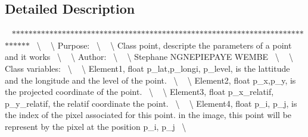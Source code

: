 \subsection{Detailed Description}
~\newline
$\ast$$\ast$$\ast$$\ast$$\ast$$\ast$$\ast$$\ast$$\ast$$\ast$$\ast$$\ast$$\ast$$\ast$$\ast$$\ast$$\ast$$\ast$$\ast$$\ast$$\ast$$\ast$$\ast$$\ast$$\ast$$\ast$$\ast$$\ast$$\ast$$\ast$$\ast$$\ast$$\ast$$\ast$$\ast$$\ast$$\ast$$\ast$$\ast$$\ast$$\ast$$\ast$$\ast$$\ast$$\ast$$\ast$$\ast$$\ast$$\ast$$\ast$$\ast$$\ast$$\ast$$\ast$$\ast$$\ast$$\ast$$\ast$$\ast$$\ast$$\ast$$\ast$$\ast$$\ast$$\ast$$\ast$$\ast$$\ast$$\ast$$\ast$$\ast$$\ast$$\ast$$\ast$$\ast$$\ast$~\newline
\textbackslash{} ~\newline
\textbackslash{} Purpose\+:~\newline
\textbackslash{} ~\newline
\textbackslash{} Class point, descripte the parameters of a point and it works~\newline
\textbackslash{} ~\newline
\textbackslash{} Author\+:~\newline
\textbackslash{} ~\newline
\textbackslash{} Stephane N\+G\+N\+E\+P\+I\+E\+P\+A\+YE W\+E\+M\+BE~\newline
\textbackslash{} ~\newline
\textbackslash{} Class variables\+:~\newline
\textbackslash{} ~\newline
\textbackslash{} Element1, float p\+\_\+lat,p\+\_\+longi, p\+\_\+level, is the lattitude and the longitude and the level of the point.~\newline
\textbackslash{} ~\newline
\textbackslash{} Element2, float p\+\_\+x,p\+\_\+y, is the projected coordinate of the point.~\newline
\textbackslash{} ~\newline
\textbackslash{} Element3, float p\+\_\+x\+\_\+relatif, p\+\_\+y\+\_\+relatif, the relatif coordinate the point.~\newline
\textbackslash{} ~\newline
\textbackslash{} Element4, float p\+\_\+i, p\+\_\+j, is the index of the pixel associated for this point. in the image, this point will be represent by the pixel at the position p\+\_\+i, p\+\_\+j~\newline
\textbackslash{} ~\newline


